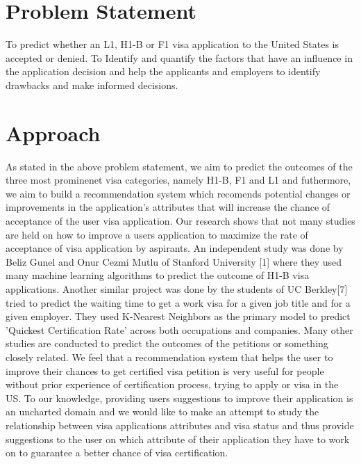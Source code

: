 \documentclass[conference]{IEEEtran}
\begin{document}
\section{Problem Statement}
To predict whether an L1, H1-B or F1 visa application to the United States is accepted or denied. 
To Identify and quantify the factors that have an influence in the application decision and  help the applicants and employers to identify drawbacks and make informed decisions.

\section{Approach}
As stated in the above problem statement, we aim to predict the outcomes of the three most prominenet visa categories, namely H1-B, F1 and L1 and futhermore, we aim to build a recommendation system which recomends potential changes or improvements in the application's attributes that will increase the chance of acceptance of the user visa application. 
Our research shows that not many studies are held on how to improve a users application to maximize the rate of acceptance of visa application by aspirants. An independent study was done by Beliz Gunel and Onur Cezmi Mutlu of Stanford University [1] where they used many machine learning algorithms to predict the outcome of H1-B visa applications. Another similar project was done by the students of UC Berkley[7] tried
to predict the waiting time to get a work visa for a
given job title and for a given employer. They used
K-Nearest Neighbors as the primary model to predict
’Quickest Certification Rate’ across both occupations
and companies. Many other studies are conducted to predict the outcomes of the petitions or something closely related.
We feel that a recommendation system that helps the user to improve their chances to get certified visa petition is very useful for people without prior experience of certification process, trying to apply or visa in the US. To our knowledge, providing users suggestions to improve their application is an uncharted domain and we would like to make an attempt to study the relationship between visa applications attributes and visa status and thus provide suggestions to the user on which attribute of their application they have to work on to guarantee a better chance of visa certification.
\end{document}
